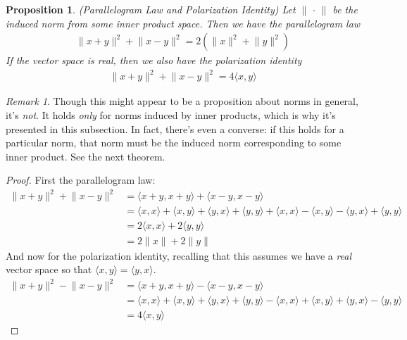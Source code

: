\documentclass[12pt]{book}
\numberwithin{equation}{section} %
\theoremstyle{plain}
\newtheorem{prop}[thm]{Proposition}
\theoremstyle{definition}
\theoremstyle{remark}
\newtheorem*{rmk}{Remark}
\begin{document}
\begin{prop}\emph{(Parallelogram Law and Polarization Identity)}
Let $\lVert\,\cdot\,\rVert$ be the induced norm from some inner product
space.
Then we have the \emph{parallelogram law}
\begin{align*}
  \lVert x+y\rVert^2 +
  \lVert x-y\rVert^2 =
  2\left( \lVert x \rVert^2 + \lVert y \rVert^2 \right)
\end{align*}
If the vector space is \emph{real}, then we also have the
\emph{polarization identity}
\begin{align*}
  \lVert x+y\rVert^2 +
  \lVert x-y\rVert^2 = 4\langle x,y \rangle
\end{align*}
\end{prop}
\begin{rmk}
Though this might appear to be a proposition about norms in general,
it's \emph{not}. It holds \emph{only} for norms induced by inner
products, which is why it's presented in this subsection.
In fact, there's even a converse:
if this holds for a particular norm, that norm must be the induced norm
corresponding to some inner product. See the next theorem.
\end{rmk}
\begin{proof}
First the parallelogram law:
\begin{align*}
  \lVert x+y\rVert^2 +
  \lVert x-y\rVert^2
  &=
  \langle x+y, x+y\rangle
  + \langle x-y, x-y\rangle \\
  &=
  \langle x, x\rangle
  + \langle x, y\rangle
  + \langle y, x\rangle
  + \langle y, y\rangle
  + \langle x, x\rangle
  - \langle x, y\rangle
  - \langle y, x\rangle
  + \langle y, y\rangle \\
  &=
  2\langle x, x\rangle
  + 2\langle y, y\rangle \\
  &=
  2\lVert x\rVert
  + 2\lVert y\rVert
\end{align*}
And now for the polarization identity, recalling that this assumes we
have a \emph{real} vector space so that
$\langle x,y\rangle = \langle y,x\rangle$.
\begin{align*}
  \lVert x+y\rVert^2 -
  \lVert x-y\rVert^2
  &=
  \langle x+y, x+y\rangle
  - \langle x-y, x-y\rangle \\
  &=
  \langle x, x\rangle
  + \langle x, y\rangle
  + \langle y, x\rangle
  + \langle y, y\rangle
  - \langle x, x\rangle
  + \langle x, y\rangle
  + \langle y, x\rangle
  - \langle y, y\rangle \\
  &=
  4\langle x, y\rangle
\end{align*}
\end{proof}
\end{document}
